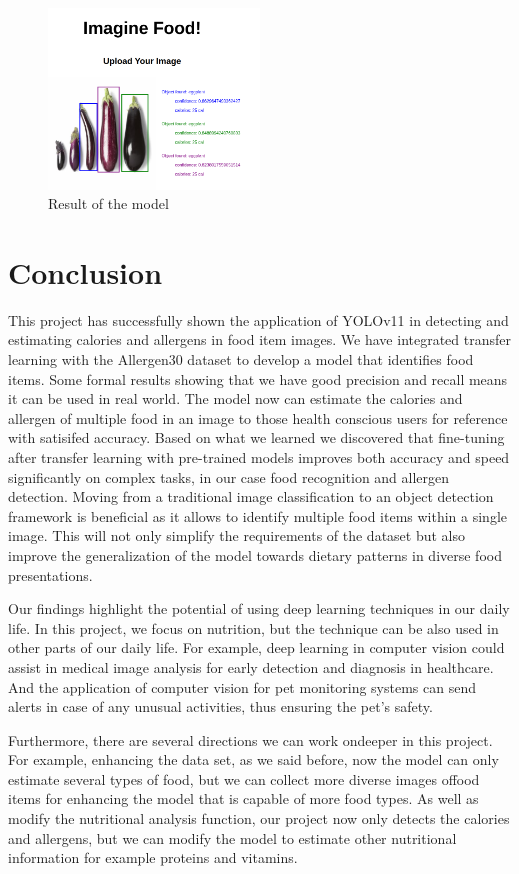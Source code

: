 \documentclass[10pt,twocolumn,letterpaper]{article}
\begin{document}
\begin{figure}[htbp]
    \centering
    \includegraphics[width=0.5\textwidth]{advanced-detector.png}
    \caption{Result of the model}\label{advanced-client-result}
\end{figure}

\section{Conclusion}

This project has successfully shown the application of YOLOv11 in detecting and estimating calories and allergens in food item images. 
We have integrated transfer learning with the Allergen30 dataset to develop a model that identifies food items. 
Some formal results showing that we have good precision and recall means it can be used in real world.
The model now can estimate the calories and allergen of multiple food in an image to those health conscious users for reference with satisifed accuracy.
Based on what we learned we discovered that fine-tuning after transfer learning with pre-trained models improves both accuracy and speed significantly on complex tasks, in our case food recognition and allergen detection.
Moving from a traditional image classification to an object detection framework is beneficial as it allows to identify multiple food items within a single image.
This will not only simplify the requirements of the dataset but also improve the generalization of the model towards dietary patterns in diverse food presentations.

Our findings highlight the potential of using deep learning techniques in our daily life. 
In this project, we focus on nutrition, but the technique can be also used in other parts of our daily life.
For example, deep learning in computer vision could assist in medical image analysis for early detection and diagnosis in healthcare.
And the application of computer vision for pet monitoring systems can send alerts in case of any unusual activities, thus ensuring the pet's safety.

Furthermore, there are several directions we can work ondeeper in this project. 
For example, enhancing the data set, as we said before, now the model can only estimate several types of food, but we can collect more diverse images offood items for enhancing the model that is capable of more food types. 
As well as modify the nutritional analysis function, our project now only detects the calories and allergens, but we can modify the model to estimate other nutritional
information for example proteins and vitamins.


{
    \small
    
    
}
\end{document}
